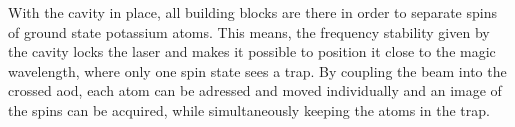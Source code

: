 With the cavity in place, all building blocks are there in order to separate spins of ground state potassium atoms. This means, the frequency stability given by the cavity locks the laser and makes it possible to position it close to the magic wavelength, where only one spin state sees a trap. By coupling the beam into the crossed \ac{aod}, each atom can be adressed and moved individually and an image of the spins can be acquired, while simultaneously keeping the atoms in the trap.

\begin{figure}[t]%
\end{figure}
